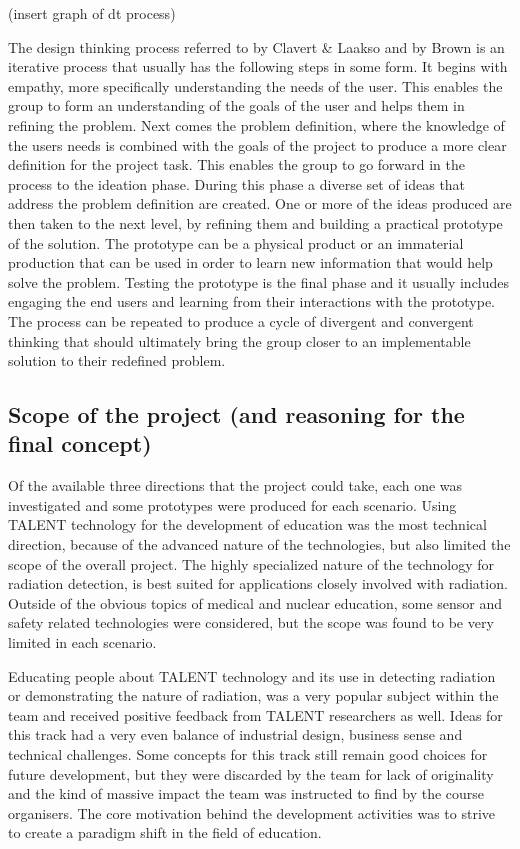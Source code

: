 \documentclass[english,12pt,a4paper,dvips]{article}
\begin{document}
(insert graph of dt process)

The design thinking process referred to by Clavert & Laakso \cite{Clavert} and by Brown \cite{Brown} is an iterative process that usually has the following steps in some form. It begins with empathy, more specifically understanding the needs of the user. This enables the group to form an understanding of the goals of the user and helps them in refining the problem. Next comes the problem definition, where the knowledge of the users needs is combined with the goals of the project to produce a more clear definition for the project task. This enables the group to go forward in the process to the ideation phase. During this phase a diverse set of ideas that address the problem definition are created. One or more of the ideas produced are then taken to the next level, by refining them and building a practical prototype of the solution. The prototype can be a physical product or an immaterial production that can be used in order to learn new information that would help solve the problem. Testing the prototype is the final phase and it usually includes engaging the end users and learning from their interactions with the prototype. \cite{Clavert} \cite{Brown} The process can be repeated to produce a cycle of divergent and convergent thinking that should ultimately bring the group closer to an implementable solution to their redefined problem.

\subsection{Scope of the project (and reasoning for the final concept)}

Of the available three directions that the project could take, each one was investigated and some prototypes were produced for each scenario. Using TALENT technology for the development of education was the most technical direction, because of the advanced nature of the technologies, but also limited the scope of the overall project. The highly specialized nature of the technology for radiation detection, is best suited for applications closely involved with radiation. Outside of the obvious topics of medical and nuclear education, some sensor and safety related technologies were considered, but the scope was found to be very limited in each scenario.

Educating people about TALENT technology and its use in detecting radiation or demonstrating the nature of radiation, was a very popular subject within the team and received positive feedback from TALENT researchers as well. Ideas for this track had a very even balance of industrial design, business sense and technical challenges. Some concepts for this track still remain good choices for future development, but they were discarded by the team for lack of originality and the kind of massive impact the team was instructed to find by the course organisers. The core motivation behind the development activities was to strive to create a paradigm shift in the field of education.
\end{document}
